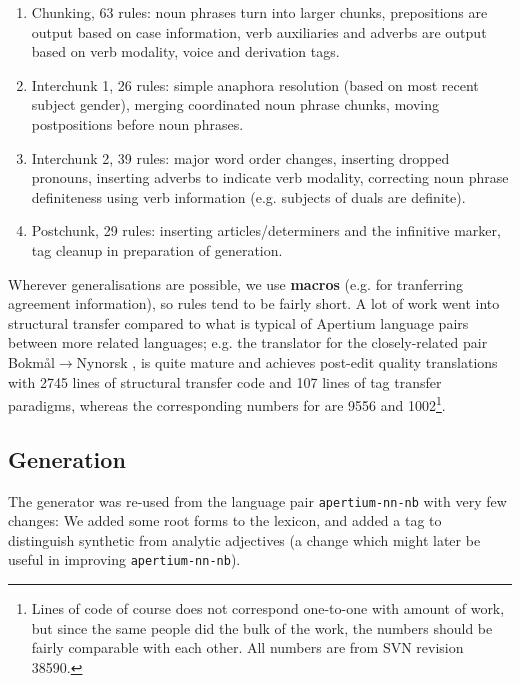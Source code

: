 \documentclass{book}
\begin{document}
\begin{enumerate}

\item Chunking, 63 rules: noun phrases turn into larger chunks,
  prepositions are output based on case information, verb auxiliaries
  and adverbs are output based on verb modality, voice and derivation
  tags.

\item Interchunk 1, 26 rules: simple anaphora resolution (based on
  most recent subject gender), merging coordinated noun phrase chunks,
  moving postpositions before noun phrases.

\item Interchunk 2, 39 rules: major word order changes, inserting
  dropped pronouns, inserting adverbs to indicate verb modality,
  correcting noun phrase definiteness using verb information (e.g.
  subjects of duals are definite).

\item Postchunk, 29 rules: inserting articles/determiners and the
  infinitive marker, tag cleanup in preparation of generation.
\end{enumerate}

Wherever generalisations are possible, we use \textbf{macros} (e.g.
for tranferring agreement information), so rules tend to be fairly
short. A lot of work went into structural transfer compared to what is
typical of Apertium language pairs between more related languages;
e.g. the translator for the closely-related pair
Bokmål$\rightarrow{}$Nynorsk \citep{unhammer2009rfr}, is quite mature
and achieves post-edit quality translations with 2745 lines of
structural transfer code and 107 lines of tag transfer paradigms,
whereas the corresponding numbers for \smenob{} are 9556 and
1002\footnote{Lines of code of course does not correspond one-to-one
  with amount of work, but since the same people did the bulk of the
  work, the numbers should be fairly comparable with each other. All
  numbers are from SVN revision 38590.}.

\subsection{Generation}
The generator was re-used from the language pair
\texttt{apertium-nn-nb} with very few changes: We added some root
forms to the lexicon, and added a tag to distinguish synthetic from analytic
adjectives (a change which might later be useful in improving
\texttt{apertium-nn-nb}).
\end{document}

